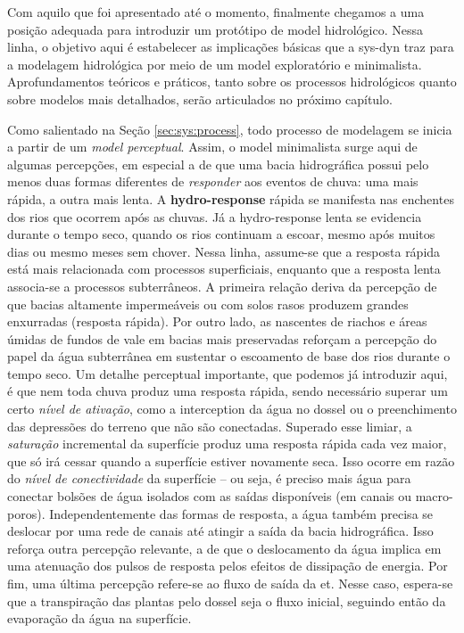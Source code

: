\documentclass[./main.tex]{subfiles}
\begin{document}
\par Com aquilo que foi apresentado até o momento, finalmente chegamos a uma posição adequada para introduzir um protótipo de \gls{model} hidrológico. Nessa linha, o objetivo aqui é estabelecer as implicações básicas que a \gls{sys-dyn} traz para a modelagem hidrológica por meio de um \gls{model} exploratório e minimalista. Aprofundamentos teóricos e práticos, tanto sobre os processos hidrológicos quanto sobre modelos mais detalhados, serão articulados no próximo capítulo. 

\par Como salientado na Seção \ref{sec:sys:process}, todo processo de modelagem se inicia a partir de um \textit{\gls{model} perceptual}. Assim, o \gls{model} minimalista surge aqui de algumas percepções, em especial a de que uma bacia hidrográfica possui pelo menos duas formas diferentes de \textit{responder} aos eventos de chuva: uma mais rápida, a outra mais lenta. A \textbf{\gls{hydro-response}} rápida se manifesta nas enchentes dos rios que ocorrem após as chuvas. Já a \gls{hydro-response} lenta se evidencia durante o tempo seco, quando os rios continuam a escoar, mesmo após muitos dias ou mesmo meses sem chover. Nessa linha, assume-se que a resposta rápida está mais relacionada com processos superficiais, enquanto que a resposta lenta associa-se a processos subterrâneos. A primeira relação deriva da percepção de que bacias altamente impermeáveis ou com solos rasos produzem grandes enxurradas (resposta rápida). Por outro lado, as nascentes de riachos e áreas úmidas de fundos de vale em bacias mais preservadas reforçam a percepção do papel da água subterrânea em sustentar o escoamento de base dos rios durante o tempo seco. Um detalhe perceptual importante, que podemos já introduzir aqui, é que nem toda chuva produz uma resposta rápida, sendo necessário superar um certo \textit{nível de ativação}, como a \gls{interception} da água no dossel ou o preenchimento das depressões do terreno que não são conectadas. Superado esse limiar, a \textit{saturação} incremental da superfície produz uma resposta rápida cada vez maior, que só irá cessar quando a superfície estiver novamente seca. Isso ocorre em razão do \textit{nível de conectividade} da superfície -- ou seja, é preciso mais água para conectar bolsões de água isolados com as saídas disponíveis (em canais ou macro-poros). Independentemente das formas de resposta, a água também precisa se deslocar por uma rede de canais até atingir a saída da bacia hidrográfica. Isso reforça outra percepção relevante, a de que o deslocamento da água implica em uma atenuação dos pulsos de resposta pelos efeitos de dissipação de energia. Por fim, uma última percepção refere-se ao fluxo de saída da \acrfull{et}. Nesse caso, espera-se que a transpiração das plantas pelo dossel seja o fluxo inicial, seguindo então da evaporação da água na superfície. 
\end{document}
